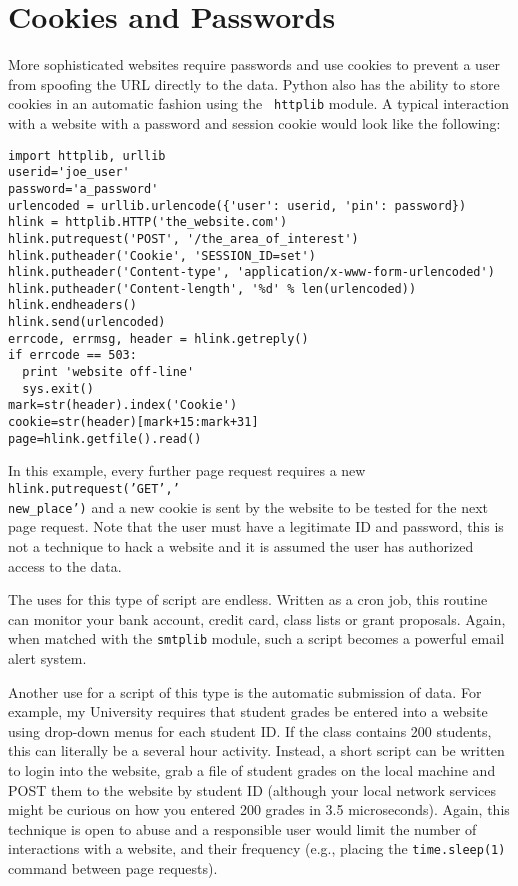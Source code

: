 \documentclass[11pt,preprint,graphicx]{aastex}
\begin{document}
\section{Cookies and Passwords}

\noindent More sophisticated websites require passwords and use cookies to
prevent a user from spoofing the URL directly to the data.  Python also has
the ability to store cookies in an automatic fashion using the {\tt
httplib} module.   A typical interaction with a website with a password and
session cookie would look like the following:

\begin{verbatim}
import httplib, urllib
userid='joe_user'
password='a_password'
urlencoded = urllib.urlencode({'user': userid, 'pin': password})
hlink = httplib.HTTP('the_website.com')
hlink.putrequest('POST', '/the_area_of_interest')
hlink.putheader('Cookie', 'SESSION_ID=set')
hlink.putheader('Content-type', 'application/x-www-form-urlencoded')
hlink.putheader('Content-length', '%d' % len(urlencoded))
hlink.endheaders()
hlink.send(urlencoded)
errcode, errmsg, header = hlink.getreply()
if errcode == 503:
  print 'website off-line'
  sys.exit()
mark=str(header).index('Cookie')
cookie=str(header)[mark+15:mark+31]
page=hlink.getfile().read()
\end{verbatim}

\noindent In this example, every further page request requires a new {\tt
hlink.putrequest('GET','\\new\_place')} and a new cookie is sent by the
website to be tested for the next page request.  Note that the user must
have a legitimate ID and password, this is not a technique to hack a
website and it is assumed the user has authorized access to the data.

\noindent The uses for this type of script are endless.  Written as a cron
job, this routine can monitor your bank account, credit card, class lists
or grant proposals.  Again, when matched with the {\tt smtplib} module,
such a script becomes a powerful email alert system.

\noindent Another use for a script of this type is the automatic submission
of data.  For example, my University requires that student grades be
entered into a website using drop-down menus for each student ID.  If the
class contains 200 students, this can literally be a several hour activity.
Instead, a short script can be written to login into the website, grab a
file of student grades on the local machine and POST them to the website by
student ID (although your local network services might be curious on how
you entered 200 grades in 3.5 microseconds).  Again, this technique is open
to abuse and a responsible user would limit the number of interactions with
a website, and their frequency (e.g., placing the {\tt time.sleep(1)}
command between page requests).
\end{document}
